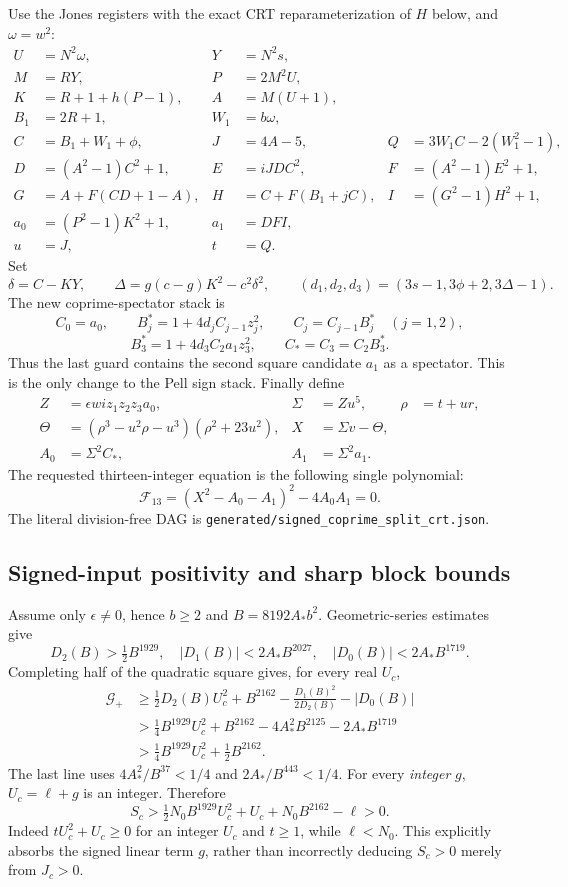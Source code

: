 Use the Jones registers with the exact CRT reparameterization of $H$ below, and $\omega=w^2$:
\begin{align*}
 U&=N^2\omega,&Y&=N^2s,\\
 M&=RY,&P&=2M^2U,\\
 K&=R+1+h(P-1),&A&=M(U+1),\\
 B_1&=2R+1,&W_1&=b\omega,\\
 C&=B_1+W_1+\phi,&J&=4A-5,&
 Q&=3W_1C-2(W_1^2-1),\\
 D&=(A^2-1)C^2+1,&E&=iJDC^2,&F&=(A^2-1)E^2+1,\\
 G&=A+F(CD+1-A),&H&=C+F(B_1+jC),&I&=(G^2-1)H^2+1,\\
 a_0&=(P^2-1)K^2+1,&a_1&=DFI,\\
 u&=J,&t&=Q.
\end{align*}
Set
\[
 \delta=C-KY,\qquad \Delta=g(c-g)K^2-c^2\delta^2,
 \qquad (d_1,d_2,d_3)=(3s-1,3\phi+2,3\Delta-1).
\]
The new coprime-spectator stack is
\[
 C_0=a_0,\qquad B_j^*=1+4d_jC_{j-1}z_j^2,\qquad
 C_j=C_{j-1}B_j^*\quad(j=1,2),
\]
\[
 B_3^*=1+4d_3C_2a_1z_3^2,\qquad C_*=C_3=C_2B_3^*.
\]
Thus the last guard contains the second square candidate $a_1$ as a
spectator. This is the only change to the Pell sign stack.
Finally define
\begin{align*}
 Z&=\epsilon wi z_1z_2z_3a_0,&\Sigma&=Zu^5,&\rho&=t+ur,\\
 \Theta&=(\rho^3-u^2\rho-u^3)(\rho^2+23u^2),&
 X&=\Sigma v-\Theta,\\
 A_0&=\Sigma^2C_*,&A_1&=\Sigma^2a_1.
\end{align*}
The requested thirteen-integer equation is the following single polynomial:
\begin{equation}\label{eq:jones-seeded}
 \boxed{\mathcal F_{13}=(X^2-A_0-A_1)^2-4A_0A_1=0.}
\end{equation}
The literal division-free DAG is \texttt{generated/signed\_coprime\_split\_crt.json}.

\subsection{Signed-input positivity and sharp block bounds}
Assume only $\epsilon\ne0$, hence $b\ge2$ and $B=8192A_*b^2$.
Geometric-series estimates give
\[
 D_2(B)>\tfrac12B^{1929},\quad
 |D_1(B)|<2A_*B^{2027},\quad |D_0(B)|<2A_*B^{1719}.
\]
Completing half of the quadratic square gives, for every real $U_c$,
\begin{align*}
 \mathcal G_+
 &\ge\tfrac12 D_2(B)U_c^2+B^{2162}
      -\frac{D_1(B)^2}{2D_2(B)}-|D_0(B)|\\
 &>\tfrac14 B^{1929}U_c^2+B^{2162}
      -4A_*^2B^{2125}-2A_*B^{1719}\\
 &>\tfrac14 B^{1929}U_c^2+\tfrac12B^{2162}.
\end{align*}
The last line uses $4A_*^2/B^{37}<1/4$ and
$2A_*/B^{443}<1/4$. For every \emph{integer} $g$, $U_c=\ell+g$ is an
integer. Therefore
\[
 S_c>\tfrac12N_0B^{1929}U_c^2+U_c+N_0B^{2162}-\ell>0.
\]
Indeed $tU_c^2+U_c\ge0$ for an integer $U_c$ and $t\ge1$, while
$\ell<N_0$. This explicitly absorbs the signed linear term $g$, rather than
incorrectly deducing $S_c>0$ merely from $J_c>0$.

